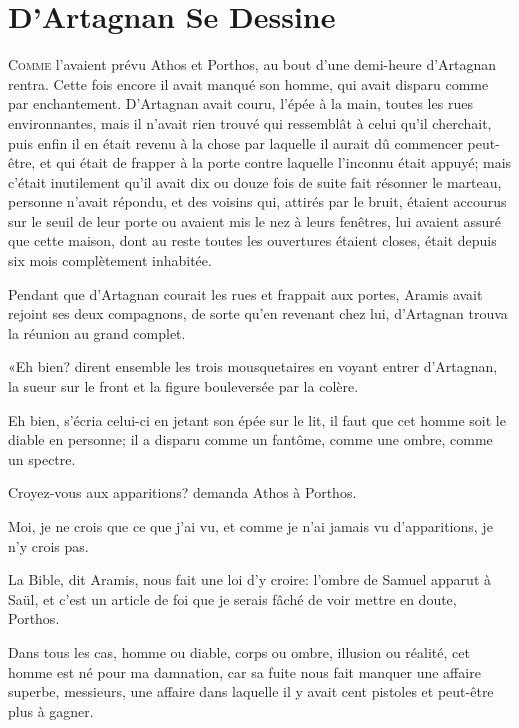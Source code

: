 
\chapter{D'Artagnan Se Dessine}

\lettrine{C}{omme} l'avaient prévu Athos et Porthos, au bout d'une demi-heure d'Artagnan rentra. Cette fois encore il avait manqué son homme, qui avait disparu comme par enchantement. D'Artagnan avait couru, l'épée à la main, toutes les rues environnantes, mais il n'avait rien trouvé qui ressemblât à celui qu'il cherchait, puis enfin il en était revenu à la chose par laquelle il aurait dû commencer peut-être, et qui était de frapper à la porte contre laquelle l'inconnu était appuyé; mais c'était inutilement qu'il avait dix ou douze fois de suite fait résonner le marteau, personne n'avait répondu, et des voisins qui, attirés par le bruit, étaient accourus sur le seuil de leur porte ou avaient mis le nez à leurs fenêtres, lui avaient assuré que cette maison, dont au reste toutes les ouvertures étaient closes, était depuis six mois complètement inhabitée. 

Pendant que d'Artagnan courait les rues et frappait aux portes, Aramis avait rejoint ses deux compagnons, de sorte qu'en revenant chez lui, d'Artagnan trouva la réunion au grand complet. 

«Eh bien? dirent ensemble les trois mousquetaires en voyant entrer d'Artagnan, la sueur sur le front et la figure bouleversée par la colère. 

\speak  Eh bien, s'écria celui-ci en jetant son épée sur le lit, il faut que cet homme soit le diable en personne; il a disparu comme un fantôme, comme une ombre, comme un spectre. 

\speak  Croyez-vous aux apparitions? demanda Athos à Porthos. 

\speak  Moi, je ne crois que ce que j'ai vu, et comme je n'ai jamais vu d'apparitions, je n'y crois pas. 

\speak  La Bible, dit Aramis, nous fait une loi d'y croire: l'ombre de Samuel apparut à Saül, et c'est un article de foi que je serais fâché de voir mettre en doute, Porthos. 

\speak  Dans tous les cas, homme ou diable, corps ou ombre, illusion ou réalité, cet homme est né pour ma damnation, car sa fuite nous fait manquer une affaire superbe, messieurs, une affaire dans laquelle il y avait cent pistoles et peut-être plus à gagner. 

